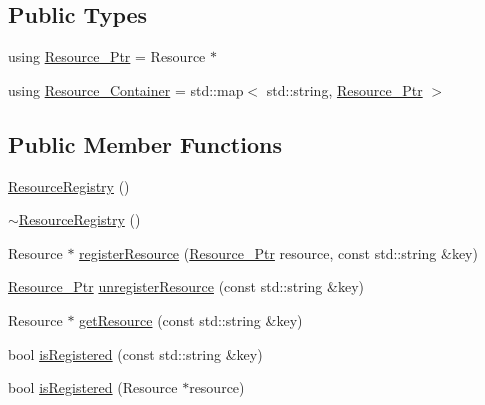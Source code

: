 \subsection*{Public Types}
\begin{DoxyCompactItemize}
\item 
using \mbox{\hyperlink{classec_1_1_resource_registry_a77cf5381229bff47d251603c783115fe}{Resource\+\_\+\+Ptr}} = Resource $\ast$
\item 
using \mbox{\hyperlink{classec_1_1_resource_registry_a0a2b5090a2bbc638a04a2c283812b956}{Resource\+\_\+\+Container}} = std\+::map$<$ std\+::string, \mbox{\hyperlink{classec_1_1_resource_registry_a77cf5381229bff47d251603c783115fe}{Resource\+\_\+\+Ptr}} $>$
\end{DoxyCompactItemize}
\subsection*{Public Member Functions}
\begin{DoxyCompactItemize}
\item 
\mbox{\hyperlink{classec_1_1_resource_registry_a9e0fdc82b578be6f0477f61116d5b361}{Resource\+Registry}} ()
\item 
\mbox{\hyperlink{classec_1_1_resource_registry_aa3153d0d76d45905833bafab53341731}{$\sim$\+Resource\+Registry}} ()
\item 
Resource $\ast$ \mbox{\hyperlink{classec_1_1_resource_registry_a91b0fa34611e9637ea2c0795a720b355}{register\+Resource}} (\mbox{\hyperlink{classec_1_1_resource_registry_a77cf5381229bff47d251603c783115fe}{Resource\+\_\+\+Ptr}} resource, const std\+::string \&key)
\item 
\mbox{\hyperlink{classec_1_1_resource_registry_a77cf5381229bff47d251603c783115fe}{Resource\+\_\+\+Ptr}} \mbox{\hyperlink{classec_1_1_resource_registry_ae1227f72ea04032d4e757ac4b5b0845a}{unregister\+Resource}} (const std\+::string \&key)
\item 
Resource $\ast$ \mbox{\hyperlink{classec_1_1_resource_registry_af5d34ac75347419b656d63ddd2728154}{get\+Resource}} (const std\+::string \&key)
\item 
bool \mbox{\hyperlink{classec_1_1_resource_registry_a04957125997e1ec7c84a663c6a309287}{is\+Registered}} (const std\+::string \&key)
\item 
bool \mbox{\hyperlink{classec_1_1_resource_registry_abe562e4ce5819ae3d57c3dc9e58b16a4}{is\+Registered}} (Resource $\ast$resource)
\end{DoxyCompactItemize}


